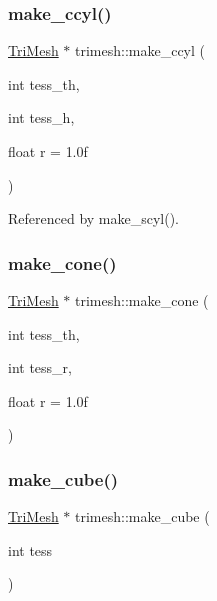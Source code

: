 \mbox{\label{namespacetrimesh_a15ed630028c3fbc7ed99a738ba3a3f86}} 
\subsubsection{\texorpdfstring{make\+\_\+ccyl()}{make\_ccyl()}}
{\footnotesize\ttfamily \hyperlink{classtrimesh_1_1TriMesh}{Tri\+Mesh} $\ast$ trimesh\+::make\+\_\+ccyl (\begin{DoxyParamCaption}\item[{int}]{tess\+\_\+th,  }\item[{int}]{tess\+\_\+h,  }\item[{float}]{r = {\ttfamily 1.0f} }\end{DoxyParamCaption})}



Referenced by make\+\_\+scyl().

\mbox{\label{namespacetrimesh_a7c992f5a57f713ce40a2e780bb30ffed}} 
\subsubsection{\texorpdfstring{make\+\_\+cone()}{make\_cone()}}
{\footnotesize\ttfamily \hyperlink{classtrimesh_1_1TriMesh}{Tri\+Mesh} $\ast$ trimesh\+::make\+\_\+cone (\begin{DoxyParamCaption}\item[{int}]{tess\+\_\+th,  }\item[{int}]{tess\+\_\+r,  }\item[{float}]{r = {\ttfamily 1.0f} }\end{DoxyParamCaption})}

\mbox{\label{namespacetrimesh_a4cea0b6c59008a228a49789ddb7ef32a}} 
\subsubsection{\texorpdfstring{make\+\_\+cube()}{make\_cube()}}
{\footnotesize\ttfamily \hyperlink{classtrimesh_1_1TriMesh}{Tri\+Mesh} $\ast$ trimesh\+::make\+\_\+cube (\begin{DoxyParamCaption}\item[{int}]{tess }\end{DoxyParamCaption})}

